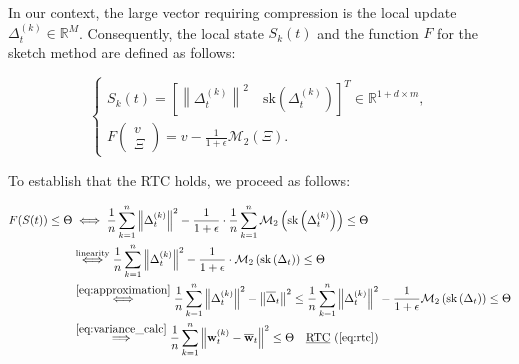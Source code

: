 \noindent
In our context, the large vector requiring compression is the local update \( \Delta_t^{(k)} \in \mathbb{R}^M \). Consequently, the local state \( S_k(t) \) and the function
\( F \) for the sketch method are defined as follows:

\begin{equation}
    \begin{cases}
        S_k(t) = \left[ \left\| \Delta_t^{(k)} \right\|^2 \quad \text{sk} \left( \Delta_t^{(k)} \right) \right]^T \in \mathbb{R}^{1 + d \times m}, \\
        F \left( \begin{array}{c} v \\ \Xi \end{array} \right) = v - \frac{1}{1 + \epsilon} \mathcal{M}_2(\Xi).
    \end{cases}
    \label{eq:sketch_redefinition}
\end{equation}


\noindent
To establish that the RTC holds, we proceed as follows:

\begin{align}
    F(S(t)) \leq \Theta & \iff \frac{1}{n} \sum_{k=1}^n \left\| \Delta_t^{(k)} \right\|^2 - \frac{1}{1 + \epsilon} \cdot \frac{1}{n} \sum_{k=1}^n \mathcal{M}_2 \left( \text{sk} \left( \Delta_t^{(k)} \right) \right) \leq \Theta \notag                                                                                                       \\
                        & \overset{\text{linearity}}{\iff} \frac{1}{n} \sum_{k=1}^n \left\| \Delta_t^{(k)} \right\|^2 - \frac{1}{1 + \epsilon} \cdot \mathcal{M}_2 \left( \text{sk} \left( \Delta_t \right) \right) \leq \Theta \notag                                                                                                          \\
                        & \overset{\ref{eq:approximation}}{\iff} \frac{1}{n} \sum_{k=1}^n \left\| \Delta_t^{(k)} \right\|^2 - \left\| \overline{\Delta}_t \right\|^2 \leq \frac{1}{n} \sum_{k=1}^n \left\| \Delta_t^{(k)} \right\|^2 - \frac{1}{1 + \epsilon} \mathcal{M}_2 \left( \text{sk} \left( \Delta_t \right) \right) \leq \Theta \notag \\
                        & \overset{\ref{eq:variance_calc}}{\implies} \frac{1}{n} \sum_{k=1}^n \left\| \mathbf{w}_t^{(k)} - \overline{\mathbf{w}}_t \right\|^2 \leq \Theta \quad \text{\underline{RTC} (\Cref{eq:rtc})}
\end{align}

